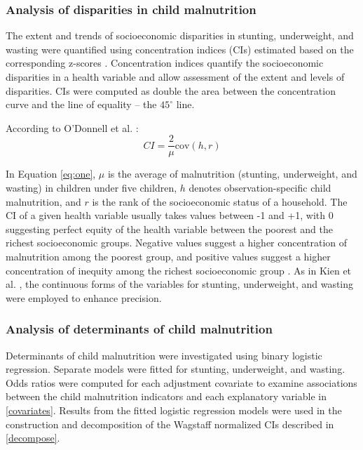 \documentclass[sn-basic,Numbered,pdflatex]{sn-jnl}
\theoremstyle{remark}
\theoremstyle{definition}
\begin{document}
\hypertarget{analysis-of-disparities-in-child-malnutrition}{%
\subsubsection{Analysis of disparities in child
malnutrition}\label{analysis-of-disparities-in-child-malnutrition}}

The extent and trends of socioeconomic disparities in stunting,
underweight, and wasting were quantified using concentration indices
(CIs) estimated based on the corresponding z-scores
\citep{odonnell_analyzing_2008, Wagstaff1991, Wagstaff2000}.
Concentration indices quantify the socioeconomic disparities in a health
variable and allow assessment of the extent and levels of disparities.
CIs were computed as double the area between the concentration curve and
the line of equality -- the \(45^{\circ}\) line.

According to O'Donnell et al. \citep{odonnell_analyzing_2008}:
\begin{equation}
CI = \frac{2}{\mu} \textrm{cov}(h, r)
\label{eq:one}
\end{equation}

In Equation \ref{eq:one}, \(\mu\) is the average of malnutrition
(stunting, underweight, and wasting) in children under five children,
\(h\) denotes observation-specific child malnutrition, and \(r\) is the
rank of the socioeconomic status of a household. The CI of a given
health variable usually takes values between -1 and +1, with 0
suggesting perfect equity of the health variable between the poorest and
the richest socioeconomic groups. Negative values suggest a higher
concentration of malnutrition among the poorest group, and positive
values suggest a higher concentration of inequity among the richest
socioeconomic group
\citep{Akombi2019, jonah2018, kien_trends_2016, Wagstaff2000}. As in
Kien et al. \citep{kien_trends_2016}, the continuous forms of the
variables for stunting, underweight, and wasting were employed to
enhance precision.

\hypertarget{analysis-of-determinants-of-child-malnutrition}{%
\subsubsection{Analysis of determinants of child
malnutrition}\label{analysis-of-determinants-of-child-malnutrition}}

Determinants of child malnutrition were investigated using binary
logistic regression. Separate models were fitted for stunting,
underweight, and wasting. Odds ratios were computed for each adjustment
covariate to examine associations between the child malnutrition
indicators and each explanatory variable in \ref{covariates}. Results
from the fitted logistic regression models were used in the construction
and decomposition of the Wagstaff normalized CIs described in
\ref{decompose}.
\end{document}
